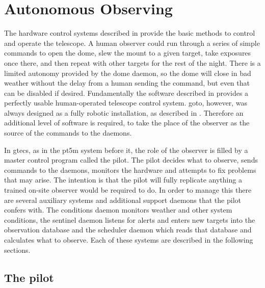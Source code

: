 
\newpage
\section{Autonomous Observing}
\label{sec:autonomous}
\begin{colsection}


\begin{colsection}

The hardware control systems described in  provide the basic methods to control and operate the telescope. A human observer could run through a series of simple commands to open the dome, slew the mount to a given target, take exposures once there, and then repeat with other targets for the rest of the night. There is a limited autonomy provided by the dome daemon, so the dome will close in bad weather without the delay from a human sending the command, but even that can be disabled if desired. Fundamentally the software described in  provides a perfectly usable human-operated telescope control system. \gls{goto}, however, was always designed as a fully robotic installation, as described in . Therefore an additional level of software is required, to take the place of the observer as the source of the commands to the daemons.

In \gls{gtecs}, as in the \gls{pt5m} system before it, the role of the observer is filled by a master control program called the pilot. The pilot decides what to observe, sends commands to the daemons, monitors the hardware and attempts to fix problems that may arise. The intention is that the pilot will fully replicate anything a trained on-site observer would be required to do. In order to manage this there are several auxiliary systems and additional support daemons that the pilot confers with. The conditions daemon monitors weather and other system conditions, the sentinel daemon listens for alerts and enters new targets into the observation database and the scheduler daemon which reads that database and calculates what to observe. Each of these systems are described in the following sections.

\end{colsection}


\subsection{The pilot}
\label{sec:pilot}
\begin{colsection}


\end{colsection}
\end{colsection}
